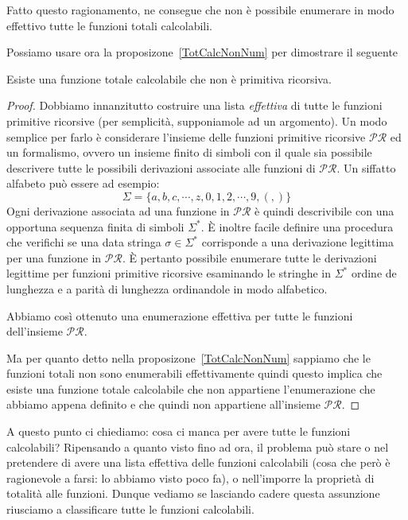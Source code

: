 Fatto questo ragionamento, ne consegue che non è possibile enumerare
in modo effettivo tutte le funzioni totali calcolabili.

Possiamo usare ora la proposizone~\ref{TotCalcNonNum} per dimostrare il seguente

\begin{thm}\label{diagRic} Esiste una funzione totale calcolabile che non
è primitiva ricorsiva.
\end{thm}

\begin{proof} Dobbiamo innanzitutto costruire una lista \emph{effettiva} di
tutte le funzioni primitive ricorsive (per semplicità, supponiamole ad
un argomento).  Un modo semplice per farlo è considerare l'insieme
delle funzioni primitive ricorsive $\mathcal{PR}$ ed un formalismo,
ovvero un insieme finito di simboli con il quale sia possibile
descrivere tutte le possibili derivazioni associate alle funzioni di
$\mathcal{PR}$. Un siffatto alfabeto può essere ad esempio:
$$\Sigma = \lbrace a, b, c, \cdots ,z , 0, 1, 2, \cdots , 9, (, ) \rbrace$$
Ogni derivazione associata ad una funzione in $\mathcal{PR}$ \`e quindi
descrivibile con una opportuna sequenza finita di simboli $\Sigma^{*}$. \`E
inoltre facile definire una procedura che verifichi se una data stringa $\sigma
\in \Sigma^{*}$ corrisponde a una derivazione legittima per una funzione in
$\mathcal{PR}$. \`E pertanto possibile enumerare tutte le derivazioni legittime
per funzioni primitive ricorsive esaminando le stringhe in $\Sigma^{*}$ ordine
de lunghezza e a parit\`a di lunghezza ordinandole in modo alfabetico.

Abbiamo cos\`i ottenuto una enumerazione effettiva per tutte le funzioni
dell'insieme $\mathcal{PR}$.

Ma per quanto detto nella proposizone~\ref{TotCalcNonNum} sappiamo che le
funzioni totali non sono enumerabili effettivamente quindi questo implica che
esiste una funzione totale calcolabile che non appartiene l'enumerazione che
abbiamo appena definito e che quindi non appartiene all'insieme $\mathcal{PR}$.
\end{proof}

A questo punto ci chiediamo: cosa ci manca per avere tutte le funzioni
calcolabili?
Ripensando a quanto visto fino ad ora, il problema pu\`o stare o nel pretendere
di avere una lista effettiva delle funzioni calcolabili (cosa che per\`o \`e
ragionevole a farsi: lo abbiamo visto poco fa), o nell'imporre la propriet\`a di
totalit\`a alle funzioni. Dunque vediamo se lasciando cadere questa assunzione
riusciamo a classificare tutte le funzioni calcolabili.


